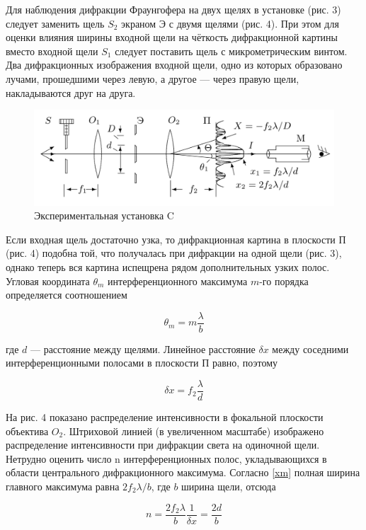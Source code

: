 \documentclass[12pt]{kiarticle} %
\begin{document}
Для наблюдения дифракции Фраунгофера на двух щелях в установке (рис. 3) следует заменить щель $ S_2 $ экраном Э с двумя щелями
(рис. 4). При этом для оценки влияния ширины входной щели на чёткость дифракционной картины вместо входной щели $ S_1 $ следует поставить щель с микрометрическим винтом. Два дифракционных изображения входной щели, одно из которых образовано лучами, прошедшими через левую, а другое --- через правую щели, накладываются друг на друга.

	\begin{figure}[h!]
		\centering
		\includegraphics[width=0.8\linewidth]{c.png}
		\caption{Экспериментальная установка C}
		\label{labC}
	\end{figure}

Если входная щель достаточно узка, то дифракционная картина
в плоскости П (рис. 4) подобна той, что получалась при дифракции
на одной щели (рис. 3), однако теперь вся картина испещрена рядом
дополнительных узких полос.
Угловая координата $ \theta_m $ интерференционного максимума $ m $-го порядка определяется соотношением

\begin{equation}\label{}
\theta_m = m \dfrac{\lambda}{b}
\end{equation}

где $ d $ --- расстояние между щелями. Линейное расстояние $ \delta x $ между соседними интерференционными полосами в плоскости П равно, поэтому

\begin{equation}\label{dx}
\delta x = f_2 \dfrac{\lambda}{d}
\end{equation}

На рис. 4 показано распределение интенсивности в фокальной плоскости объектива $ O_2 $. Штриховой линией (в увеличенном масштабе)
изображено распределение интенсивности при дифракции света на одиночной щели. Нетрудно оценить число n интерференционных полос,
укладывающихся в области центрального дифракционного максимума.
Согласно \eqref{xm} полная ширина главного максимума равна $ 2 f_2 \lambda /b $, где $ b $ ширина щели, отсюда

\begin{equation}\label{n}
n = \dfrac{2f_2 \lambda}{b} \dfrac{1}{\delta x} = \dfrac{2d}{b}
\end{equation}
\end{document}
